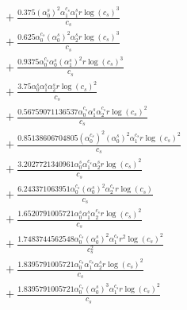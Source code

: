 \documentclass[10pt]{article}
\begin{document}
\begin{align*}
&{}  + \frac{0.375 \left(\alpha_{0}^s\right)^{2} \alpha_{1}^{c_s} \alpha_{1}^s r \log{\left(c_{s} \right)}^{3}}{c_{s}} \\
&{}  + \frac{0.625 \alpha_{0}^{c_s} \left(\alpha_{0}^s\right)^{2} \alpha_{2}^s r \log{\left(c_{s} \right)}^{3}}{c_{s}} \\
&{}  + \frac{0.9375 \alpha_{0}^{c_s} \alpha_{0}^s \left(\alpha_{1}^s\right)^{2} r \log{\left(c_{s} \right)}^{3}}{c_{s}} \\
&{}  + \frac{3.75 \alpha_{0}^s \alpha_{1}^s \alpha_{2}^s r \log{\left(c_{s} \right)}^{2}}{c_{s}} \\
&{}  + \frac{0.56759071136537 \alpha_{0}^{c_s} \alpha_{1}^s \alpha_{2}^{c_s} r \log{\left(c_{s} \right)}^{2}}{c_{s}} \\
&{}  + \frac{0.85138606704805 \left(\alpha_{0}^{c_s}\right)^{2} \left(\alpha_{0}^s\right)^{2} \alpha_{1}^{c_s} r \log{\left(c_{s} \right)}^{2}}{c_{s}} \\
&{}  + \frac{3.2027721340961 \alpha_{0}^s \alpha_{1}^{c_s} \alpha_{2}^s r \log{\left(c_{s} \right)}^{2}}{c_{s}} \\
&{}  + \frac{6.243371063951 \alpha_{0}^{c_s} \left(\alpha_{0}^s\right)^{2} \alpha_{2}^{c_s} r \log{\left(c_{s} \right)}}{c_{s}} \\
&{}  + \frac{1.6520791005721 \alpha_{0}^s \alpha_{1}^s \alpha_{2}^{c_s} r \log{\left(c_{s} \right)}^{2}}{c_{s}} \\
&{}  + \frac{1.7483744562548 \alpha_{0}^{c_s} \left(\alpha_{0}^s\right)^{2} \alpha_{1}^{c_s} r^{2} \log{\left(c_{s} \right)}^{2}}{c_{s}^{2}} \\
&{}  + \frac{1.8395791005721 \alpha_{0}^{c_s} \alpha_{1}^{c_s} \alpha_{2}^s r \log{\left(c_{s} \right)}^{2}}{c_{s}} \\
&{}  + \frac{1.8395791005721 \alpha_{0}^{c_s} \left(\alpha_{0}^s\right)^{3} \alpha_{1}^{c_s} r \log{\left(c_{s} \right)}^{2}}{c_{s}}
\end{align*}
\end{document}
